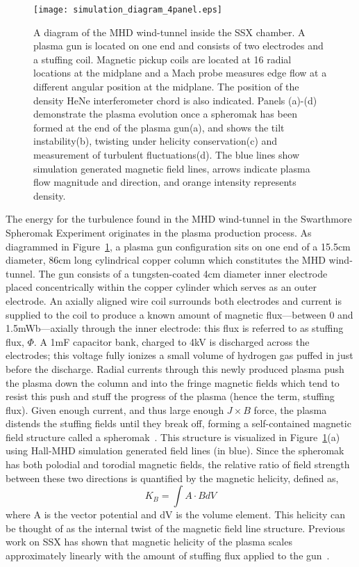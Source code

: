 \documentclass[aip,prl,amsmath,amssymb,reprint,superscriptaddress]{revtex4-1} %
\begin{document}
\begin{figure}[!htbp]
\centerline{
\texttt{[image: simulation\_diagram\_4panel.eps]}}
\caption{\label{fig:moviestills} A diagram of the MHD wind-tunnel inside the SSX chamber. A plasma gun is located on one end and consists of two electrodes and a stuffing coil. Magnetic pickup coils are located at 16 radial locations at the midplane and a Mach probe measures edge flow at a different angular position at the midplane. The position of the density HeNe interferometer chord is also indicated. Panels (a)-(d) demonstrate the plasma evolution once a spheromak has been formed at the end of the plasma gun(a), and shows the tilt instability(b), twisting under helicity conservation(c) and measurement of turbulent fluctuations(d). The blue lines show simulation generated magnetic field lines, arrows indicate plasma flow magnitude and direction, and orange intensity represents density.}
\end{figure}

The energy for the turbulence found in the MHD wind-tunnel in the Swarthmore Spheromak Experiment originates in the plasma production process. As diagrammed in Figure~\ref{fig:moviestills}, a plasma gun configuration sits on one end of a 15.5cm diameter, 86cm long cylindrical copper column which constitutes the MHD wind-tunnel. The gun consists of a tungsten-coated 4cm diameter inner electrode placed concentrically within the copper cylinder which serves as an outer electrode. An axially aligned wire coil surrounds both electrodes and current is supplied to the coil to produce a known amount of magnetic flux---between 0 and 1.5mWb---axially through the inner electrode: this flux is referred to as stuffing flux, $\Phi$. A 1mF capacitor bank, charged to 4kV is discharged across the electrodes; this voltage fully ionizes a small volume of hydrogen gas puffed in just before the discharge. Radial currents through this newly produced plasma push the plasma down the column and into the fringe magnetic fields which tend to resist this push and stuff the progress of the plasma (hence the term, stuffing flux). Given enough current, and thus large enough $J\times B$ force, the plasma distends the stuffing fields until they break off, forming a self-contained magnetic field structure called a spheromak~\cite{barnes86,jarboe93}. This structure is visualized in Figure~\ref{fig:moviestills}(a) using Hall-MHD simulation generated field lines (in blue). Since the spheromak has both polodial and torodial magnetic fields, the relative ratio of field strength between these two directions is quantified by the magnetic helicity, defined as,
\begin{equation}
K_{B} = \int A \cdot B dV
\label{eq:helicity_th}
\end{equation}
where A is the vector potential and dV is the volume element. This helicity can be thought of as the internal twist of the magnetic field line structure. Previous work on SSX has shown that magnetic helicity of the plasma scales approximately linearly with the amount of stuffing flux applied to the gun~\cite{schaffner14b}.
\end{document}
